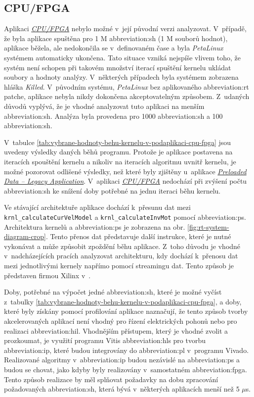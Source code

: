 \documentclass[a4paper, twoside, 11pt]{article}
\begin{document}
	\subsection{CPU/FPGA}\label{subsec:poznatky-ziskane-profilovanim-aplikaci-cpu-fpga}
		Aplikaci \hyperref[subsec:cpu-fpga]{\textit{CPU/FPGA}} nebylo možné v~její původní verzi analyzovat. V~případě, že byla aplikace spuštěna pro 1 M \gls{abbreviation:sh} (1 M souborů hodnot), aplikace běžela, ale nedokončila se v~definovaném čase a byla \textit{PetaLinux} systémem automaticky ukončena. Tato situace vzniká nejspíše vlivem toho, že systém není schopen při takovém množství iterací spuštění kernelu ukládat soubory a hodnoty analýzy. V~některých případech byla systémem zobrazena hláška \textit{Killed}. V~původním systému, \textit{PetaLinux} bez aplikovaného \gls{abbreviation:rt} patche, aplikace nebyla nikdy dokončena akceptovatelným způsobem. Z~udaných důvodů vyplývá, že je vhodné analyzovat tuto aplikaci na menším \gls{abbreviation:sh}. Analýza byla provedena pro 1000 \gls{abbreviation:sh} a 100 \gls{abbreviation:sh}.\par
		V~tabulce \ref{tab:vybrane-hodnoty-behu-kernelu-v-podaplikaci-cpu-fpga} jsou uvedeny výsledky daných běhů programu. Protože je aplikace postavena na iteracích spouštění kernelu a nikoliv na iteracích algoritmu uvnitř kernelu, je možné pozorovat odlišené výsledky, než které byly zjištěny u~aplikace \hyperref[subsec:poznatky-ziskane-profilovanim-aplikaci-preloaded-data-legacy-application]{\textit{Preloaded Data – Legacy Application}}. V~aplikaci \hyperref[subsec:cpu-fpga]{\textit{CPU/FPGA}} nedochází při zvýšení počtu \gls{abbreviation:sh} ke snížení doby potřebné na jednu iteraci běhu kernelu.\par
		Ve stávající architektuře aplikace dochází k~přesunu dat mezi \texttt{ krnl\_calculateCurVelModel} a \texttt{krnl\_calculateInvMot} pomocí \gls{abbreviation:ps}. Architektura kernelů a \gls{abbreviation:ps} je zobrazena na obr. \ref{fig:rt-system-diagram-crop}. Tento přenos dat představuje další instrukce, které je nutné vykonávat a může způsobit zpoždění běhu aplikace. Z~toho důvodu je vhodné v~nadcházejících pracích analyzovat architekturu, kdy dochází k~přenosu dat mezi jednotlivými kernely napřímo pomocí streamingu dat. Tento způsob je představen firmou Xilinx v~\cite{xilinx-github-vitis-accel-examples-stream-free-running-kernel}.\par
		Doby, potřebné na výpočet jedné \gls{abbreviation:sh}, které je možné vyčíst z~tabulky \ref{tab:vybrane-hodnoty-behu-kernelu-v-podaplikaci-cpu-fpga}, a doby, které byly získány pomocí profilování aplikace naznačují, že tento způsob tvorby akcelerovaných aplikací není vhodný pro řízení elektrických pohonů nebo pro realizaci \gls{abbreviation:hil}. Vhodnějším přístupem, který je vhodné zvolit a prozkoumat, je využití programu Vitis \gls{abbreviation:hls} pro tvorbu \gls{abbreviation:ip}, které budou integrovány do \gls{abbreviation:pl} v~programu Vivado. Realizované algoritmy v~\gls{abbreviation:ip} budou nezávislé na \gls{abbreviation:ps} a budou se chovat, jako kdyby byly realizovány v~samostatném \gls{abbreviation:fpga}. Tento způsob realizace by měl splňovat požadavky na dobu zpracování požadovaných \gls{abbreviation:sh}, která bývá v~některých aplikacích menší než 5 $\mu$s.
\end{document}
